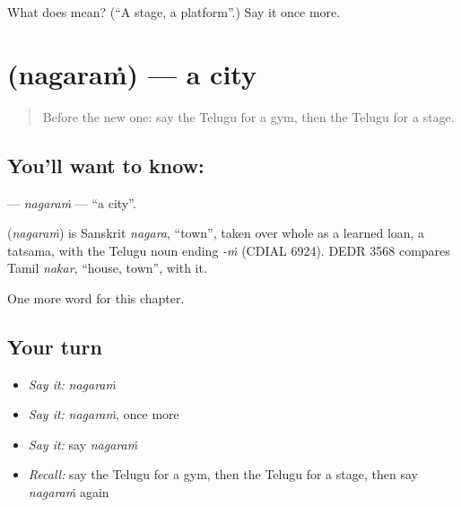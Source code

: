 \begin{tcolorbox}[breakable,colback=teal!4,colframe=teal!35!black,title={Before you move on}]
What does  mean? (\textquotedblleft{}A stage, a platform\textquotedblright{}.) Say it once more.
\end{tcolorbox}
\section[\texorpdfstring{\te{నగరం} (nagaraṁ)}{నగరం (nagaraṁ)}]{ (nagaraṁ) — a city}

\label{lesson:TE-C255-nagaram}



\begin{quote}
Before the new one: say the Telugu for a gym, then the Telugu for a stage.
\end{quote}

\subsection*{You'll want to know: }
\textbf{} — \emph{nagaraṁ} — \textquotedblleft{}a city\textquotedblright{}.

\begin{cousinweb}
\textbf{} (\emph{nagaraṁ}) is Sanskrit \emph{nagara}, \textquotedblleft{}town\textquotedblright{}, taken over whole as a learned loan, a tatsama, with the Telugu noun ending \emph{-ṁ} (CDIAL 6924). DEDR 3568 compares Tamil \emph{nakar}, \textquotedblleft{}house, town\textquotedblright{}, with it.
\end{cousinweb}

\begin{grammarlens}[title={What you've built}]
One more word for this chapter.
\end{grammarlens}

\subsection*{Your turn}
\begin{itemize}
\raggedright
  \item \emph{Say it:} \emph{nagaraṁ}
  \item \emph{Say it:} \emph{nagaraṁ}, once more
  \item \emph{Say it:} say \emph{nagaraṁ}
  \item \emph{Recall:} say the Telugu for a gym, then the Telugu for a stage, then say \emph{nagaraṁ} again
\end{itemize}

